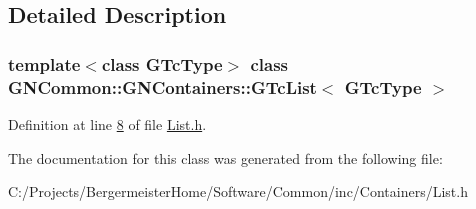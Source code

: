 \subsection{Detailed Description}
\subsubsection*{template$<$class G\+Tc\+Type$>$\newline
class G\+N\+Common\+::\+G\+N\+Containers\+::\+G\+Tc\+List$<$ G\+Tc\+Type $>$}



Definition at line \mbox{\hyperlink{_list_8h_source_l00008}{8}} of file \mbox{\hyperlink{_list_8h_source}{List.\+h}}.



The documentation for this class was generated from the following file\+:\begin{DoxyCompactItemize}
\item 
C\+:/\+Projects/\+Bergermeister\+Home/\+Software/\+Common/inc/\+Containers/List.\+h\end{DoxyCompactItemize}
